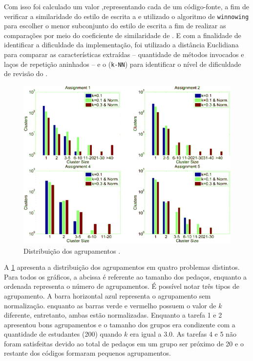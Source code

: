 	    Com isso foi calculado um valor ,representando cada 
	    de um código-fonte, a fim de verificar a similaridade do estilo de escrita 
	    a  e utilizado o algoritmo de \texttt{winnowing} \cite{schleimer2003}
	    para escolher o menor subconjunto do estilo de escrita a fim de realizar as
	    comparações por meio do coeficiente de similaridade de  \cite{jaccard1901}. E
	    com a finalidade de identificar a dificuldade da implementação, foi utilizado
	    a distância Euclidiana para comparar as características extraídas -- quantidade
	    de métodos invocados e laços de repetição aninhados -- e o 
	    (\texttt{k-NN}) para identificar o nível de dificuldade de revisão do
	    .
	    
		\begin{figure}
			\centering
			\includegraphics[width=0.7\linewidth]{imagem/clusteringPerformance}
			\captionsetup{justification=centering}
			\caption[Distribuição dos agrupamentos.]{Distribuição dos agrupamentos \cite{Wei2015}.}
			\label{fig:clusteringPerformance}
		\end{figure}
	    
		A \cref{fig:clusteringPerformance} apresenta a distribuição dos
		agrupamentos em quatro problemas distintos. Para todos os gráficos, a
		abcissa é referente ao tamanho dos pedaços, enquanto a ordenada representa
		o número de agrupamentos. É possível notar três tipos de agrupamento. A barra
		horizontal azul representa o agrupamento sem normalização. enquanto as barras
		verde e vermelho possuem o valor de $k$ diferente, entretanto, ambas estão
		normalizadas. Enquanto a tarefa 1 e 2 apresentou bons agrupamentos e o tamanho
		dos grupos era condizente com a quantidade de estudantes (200) quando $k$ era
		igual a 3.0. As tarefas 4 e 5 não foram satisfeitas devido ao total de pedaços
		em um grupo ser próximo de 20 e o restante dos códigos formaram pequenos
		agrupamentos.
		
